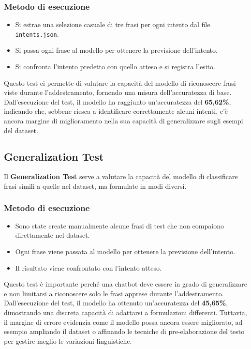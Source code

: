 \documentclass[12pt, letterpaper]{article}
\begin{document}
\subsubsection{Metodo di esecuzione}
\begin{itemize}
	\item Si estrae una selezione casuale di tre frasi per ogni intento dal file \texttt{intents.json}.
	\item Si passa ogni frase al modello per ottenere la previsione dell'intento.
	\item Si confronta l'intento predetto con quello atteso e si registra l'esito.
\end{itemize}
Questo test ci permette di valutare la capacità del modello di riconoscere frasi viste durante l'addestramento, fornendo una misura dell'accuratezza di base.\\
\newline
Dall’esecuzione del test, il modello ha raggiunto un'accuratezza del \textbf{65,62\%}, indicando che, sebbene riesca a identificare correttamente alcuni intenti, c'è ancora margine di miglioramento nella sua capacità di generalizzare sugli esempi del dataset.

\subsection{Generalization Test}

Il \textbf{Generalization Test} serve a valutare la capacità del modello di classificare frasi simili a quelle nel dataset, ma formulate in modi diversi.

\subsubsection{Metodo di esecuzione}
\begin{itemize}
	\item Sono state create manualmente alcune frasi di test che non compaiono direttamente nel dataset.
	\item Ogni frase viene passata al modello per ottenere la previsione dell'intento.
	\item Il risultato viene confrontato con l'intento atteso.
\end{itemize}
Questo test è importante perché una chatbot deve essere in grado di generalizzare e non limitarsi a riconoscere solo le frasi apprese durante l’addestramento.\\
\newline
Dall’esecuzione del test, il modello ha ottenuto un'accuratezza del \textbf{45,65\%}, dimostrando una discreta capacità di adattarsi a formulazioni differenti. Tuttavia, il margine di errore evidenzia come il modello possa ancora essere migliorato, ad esempio ampliando il dataset o affinando le tecniche di pre-elaborazione del testo per gestire meglio le variazioni linguistiche.
\end{document}

